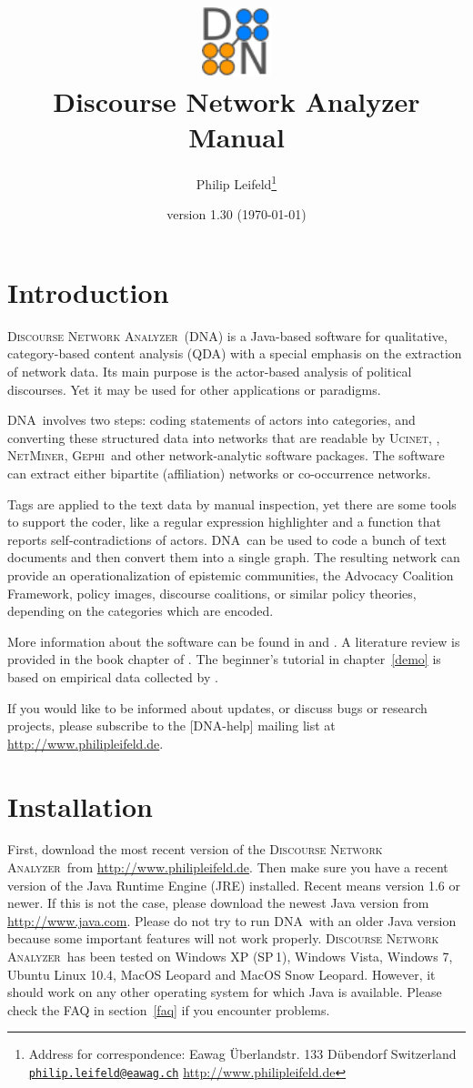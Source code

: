 \documentclass[12pt,a4paper]{scrreprt}
\author{Philip Leifeld\footnote{Address for correspondence: \medskip \newline Eawag \newline Überlandstr. 133 \newline 8600 Dübendorf \newline Switzerland \medskip \newline \href{mailto:philip.leifeld@eawag.ch}{\texttt{philip.leifeld@eawag.ch}} \newline \url{http://www.philipleifeld.de}}}
\title{\includegraphics[width=2cm]{dna32.pdf}\\ \vspace{0.5cm} Discourse Network Analyzer \\ \vspace{0.3cm} \textbf{Manual}}
\date{version 1.30 (\today)}
\newcommand{\visone}
{\textsf%
 {\protect\raisebox{.5ex}{\color[rgb]{0.1,0.1,0.1}v}%
  \protect\raisebox{.1ex}{\color[rgb]{0.3,0.3,0.3}i}%
  \protect\raisebox{-.1ex}{\color[rgb]{0.1,0.1,0.1}s}%
  \protect\raisebox{.1ex}{\color[rgb]{0.3,0.3,0.3}o}%
  \protect\raisebox{-.1ex}{\color[rgb]{0.1,0.1,0.1}n}%
  \protect\raisebox{-.4ex}{\color[rgb]{0.3,0.3,0.3}e}%
 }%
}
\newcommand{\ucinet}{\textsc{Ucinet}}
\newcommand{\dnalong}{\textsc{Discourse} \textsc{Network} \textsc{Analyzer}}
\newcommand{\dnashort}{\textsc{DNA}}
\newcommand{\netminer}{\textsc{NetMiner}}
\newcommand{\gephi}{\textsc{Gephi}}
\begin{document}
\maketitle
\setcounter{tocdepth}{2}
\tableofcontents

\chapter{Introduction}
\dnalong\ (\dnashort) is a Java-based software for qualitative, category-based content analysis (QDA) with a special emphasis on the extraction of network data. Its main purpose is the actor-based analysis of political discourses. Yet it may be used for other applications or paradigms.

\dnashort\ involves two steps: coding statements of actors into categories, and converting these structured data into networks that are readable by \ucinet, \visone, \netminer, \gephi\ and other network-analytic software packages. The software can extract either bipartite (affiliation) networks or co-occurrence networks.

Tags are applied to the text data by manual inspection, yet there are some tools to support the coder, like a regular expression highlighter and a function that reports self-contradictions of actors. \dnashort\ can be used to code a bunch of text documents and then convert them into a single graph. The resulting network can provide an operationalization of epistemic communities, the Advocacy Coalition Framework, policy images, discourse coalitions, or similar policy theories, depending on the categories which are encoded.

More information about the software can be found in \citet{leifeld2009die,leifeld2012political} and \citet{fisher2012mapping}. A literature review is provided in the book chapter of \citet{janning2009diskursnetzwerkanalyse.}. The beginner's tutorial in chapter~\ref{demo} is based on empirical data collected by \citet{fisher2012mapping}.

If you would like to be informed about updates, or discuss bugs or research projects, please subscribe to the [DNA-help] mailing list at \url{http://www.philipleifeld.de}.


\chapter{Installation}\label{installation}
First, download the most recent version of the \dnalong\ from \url{http://www.philipleifeld.de}. Then make sure you have a recent version of the Java Runtime Engine (JRE) installed. Recent means version 1.6 or newer. If this is not the case, please download the newest Java version from \url{http://www.java.com}. Please do not try to run \dnashort\ with an older Java version because some important features will not work properly. \dnalong\ has been tested on Windows XP (SP\,1), Windows Vista, Windows 7, Ubuntu Linux 10.4, MacOS Leopard and MacOS Snow Leopard. However, it should work on any other operating system for which Java is available. Please check the FAQ in section~\ref{faq} if you encounter problems.
\end{document}
